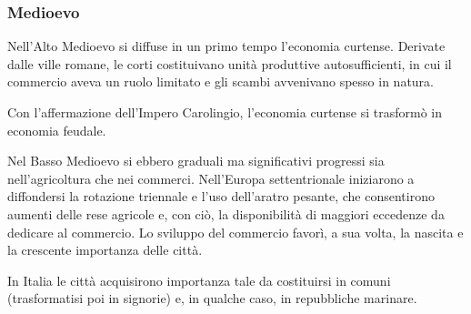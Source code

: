 \subsubsection{Medioevo}


Nell'Alto Medioevo si diffuse in un primo tempo l'economia curtense. 
Derivate dalle ville romane, le corti 
costituivano unità produttive autosufficienti, in cui il commercio aveva un 
ruolo limitato e gli scambi avvenivano spesso in natura. 


Con l'affermazione dell'Impero Carolingio, l'economia curtense si trasformò 
in economia feudale. 
% 

Nel Basso Medioevo si ebbero graduali ma significativi progressi sia 
nell'agricoltura che nei commerci. Nell'Europa settentrionale iniziarono a 
diffondersi la rotazione triennale e l'uso dell'aratro pesante, 
che consentirono aumenti delle rese agricole e, con ciò, la disponibilità di 
maggiori eccedenze da dedicare al commercio. Lo sviluppo del commercio favorì, 
a sua volta, la nascita e la crescente importanza delle città.

In Italia le città acquisirono importanza tale da costituirsi in comuni 
(trasformatisi poi in signorie) e, in qualche caso, in 
repubbliche marinare. 

